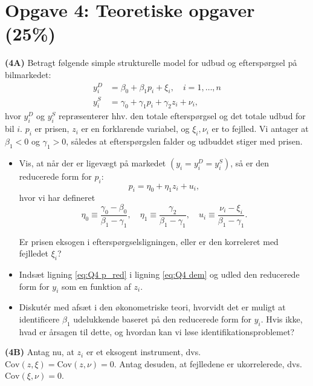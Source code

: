 \documentclass[a4paper,12pt]{article}
\begin{document}
\section*{Opgave 4: Teoretiske opgaver (25\%)}

\noindent \textbf{(4A)} Betragt følgende simple strukturelle model for udbud og efterspørgsel på bilmarkedet:
\begin{align}
y_i^D &= \beta_0 + \beta_1 p_{i} + \xi_{i}, \quad i = 1,\dots,n \label{eq:Q4 dem} \\
y_{i}^S &= \gamma_0 + \gamma_1 p_i + \gamma_2 z_{i} + \nu_{i}, \label{eq:Q4 sup}
\end{align}
hvor $y_i^D$ og $y_i^S$ repræsenterer hhv. den totale efterspørgsel og det totale udbud for bil $i$.  $p_i$ er prisen, $z_i$ er en forklarende variabel, og $\xi_i, \nu_i$ er to fejlled. Vi antager at $\beta_1 <0$ og $\gamma_1 >0$, således at efterspørgslen falder og udbuddet stiger med prisen. 

\begin{itemize}
    \item Vis, at når der er ligevægt på markedet $\left(y_i=y_i^D=y_i^S\right)$, så er den reducerede form for $p_i$:
\begin{equation}    
p_{i} = \eta_0 + \eta_1 z_{i} + u_{i}, \label{eq:Q4 p_red}
\end{equation}
hvor vi har defineret 
$$\eta_0 \equiv \frac{\gamma_0 - \beta_0}{\beta_1-\gamma_1}, \quad \eta_1 \equiv \frac{\gamma_2}{\beta_1-\gamma_1}, \quad  u_i \equiv \frac{\nu_i - \xi_i}{\beta_1-\gamma_1}.$$

Er prisen eksogen i efterspørgselsligningen, eller er den korreleret med fejlledet $\xi_i$?

\item Indsæt ligning \eqref{eq:Q4 p_red} i ligning \eqref{eq:Q4 dem} og udled den reducerede form for $y_i$ som en funktion af \(z_{i}\).

\item Diskutér med afsæt i den økonometriske teori, hvorvidt det er muligt at identificere \(\beta_1\) udelukkende baseret på den reducerede form for \(y_i\). Hvis ikke, hvad er årsagen til dette, og hvordan kan vi løse identifikationsproblemet? 
\end{itemize}
\hrulefill  
\bigskip \bigskip

\noindent \textbf{(4B)} Antag nu, at $z_i$ er et eksogent instrument, dvs.  $\text{Cov}(z, \xi) =\text{Cov}(z, \nu)= 0$. Antag desuden, at fejlledene er ukorrelerede, dvs. $\text{Cov}(\xi, \nu) =0.$
\end{document}
